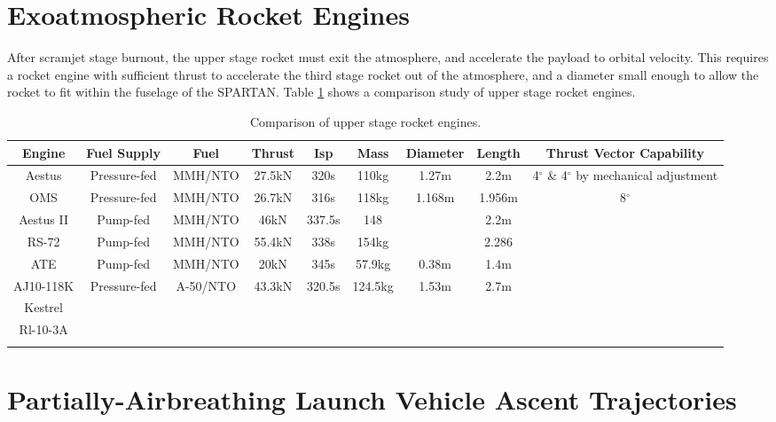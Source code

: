 \section{Exoatmospheric Rocket Engines}
After scramjet stage burnout, the upper stage rocket must exit the atmosphere, and accelerate the payload to orbital velocity. This requires a rocket engine with sufficient thrust to accelerate the third stage rocket out of the atmosphere, and a diameter small enough to allow the rocket to fit within the fuselage of the SPARTAN. Table \ref{tab:Engine} shows a comparison study of upper stage rocket engines. 

\begin{landscape}%
\begin{table}
\begin{tabular}{|c|c|c|c|c|c|c|c|c|}

	\hline Engine & Fuel Supply & Fuel & Thrust & Isp & Mass & Diameter & Length & Thrust Vector Capability \\ 
	\hline Aestus & Pressure-fed & MMH/NTO & 27.5kN & 320s & 110kg & 1.27m & 2.2m & 4$^\circ$ \& 4$^\circ$ by mechanical adjustment\\ 
	\hline OMS & Pressure-fed  & MMH/NTO & 26.7kN & 316s & 118kg & 1.168m & 1.956m & 8$^\circ$\\ 
	\hline Aestus II & Pump-fed & MMH/NTO & 46kN & 337.5s & 148 &  & 2.2m &\\ 
	\hline RS-72 & Pump-fed & MMH/NTO & 55.4kN & 338s & 154kg &  & 2.286 &\\ 
	\hline ATE & Pump-fed & MMH/NTO & 20kN & 345s & 57.9kg & 0.38m & 1.4m &\\ 
	\hline AJ10-118K & Pressure-fed & A-50/NTO & 43.3kN & 320.5s & 124.5kg & 1.53m & 2.7m & \\ 
	\hline Kestrel &  &  &  &  &  &  &   &\\ 
	\hline Rl-10-3A &  &  &  &  &  &  &   &\\ 
	\hline  &  &  &  &  &  &  &  & \\ 
	\hline 
\end{tabular} 
\caption {Comparison of upper stage rocket engines.} 
\label{tab:Engine}
\end{table}
\end{landscape}


\section{Partially-Airbreathing Launch Vehicle Ascent Trajectories}


